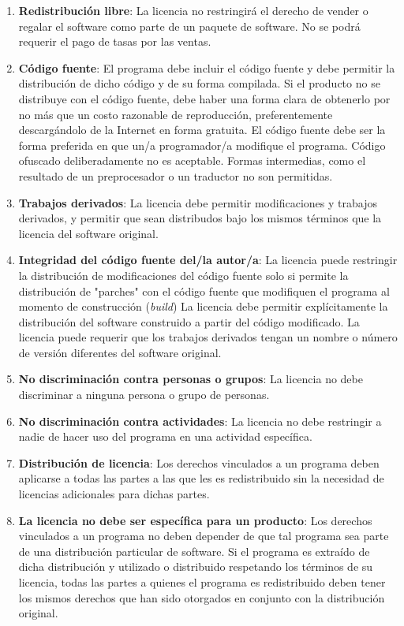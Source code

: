 \begin{enumerate}
\item {\bf Redistribución libre}: La licencia no restringirá el derecho de vender o regalar el software como parte de un paquete de software. No se podrá requerir el pago de tasas por las ventas.

\item {\bf Código fuente}: El programa debe incluir el código fuente y debe permitir la distribución de dicho código y de su forma compilada. Si el producto no se distribuye con el código fuente, debe haber una forma clara de obtenerlo por no más que un costo razonable de reproducción, preferentemente descargándolo de la Internet en forma gratuita. El código fuente debe ser la forma preferida en que un/a programador/a modifique el programa. Código ofuscado deliberadamente no es aceptable. Formas intermedias, como el resultado de un preprocesador o un traductor no son permitidas.

\item {\bf Trabajos derivados}: La licencia debe permitir modificaciones y trabajos derivados, y permitir que sean distribudos bajo los mismos términos que la licencia del software original.

\item {\bf Integridad del código fuente del/la autor/a}: La licencia puede restringir la distribución de modificaciones del código fuente solo si permite la distribución de "parches" con el código fuente que modifiquen el programa al momento de construcción (\emph{build}) La licencia debe permitir explícitamente la distribución del software construido a partir del código modificado. La licencia puede requerir que los trabajos derivados tengan un nombre o número de versión diferentes del software original.

\item {\bf No discriminación contra personas o grupos}: La licencia no debe discriminar a ninguna persona o grupo de personas.

\item {\bf No discriminación contra actividades}: La licencia no debe restringir a nadie de hacer uso del programa en una actividad específica. 

\item {\bf Distribución de licencia}: Los derechos vinculados a un programa deben aplicarse a todas las partes a las que les es redistribuido sin la necesidad de licencias adicionales para dichas partes.

\item {\bf La licencia no debe ser específica para un producto}: Los derechos vinculados a un programa no deben depender de que tal programa sea parte de una distribución particular de software. Si el programa es extraído de dicha distribución y utilizado o distribuido respetando los términos de su licencia, todas las partes a quienes el programa es redistribuido deben tener los mismos derechos que han sido otorgados en conjunto con la distribución original.


\end{enumerate}
